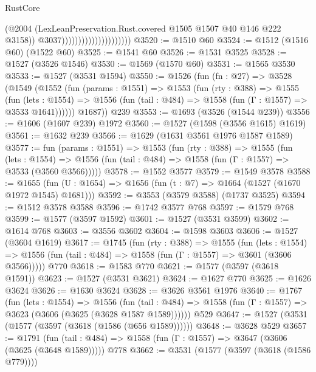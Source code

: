 \begin{lexlean}{RustCore}
\begin{coremodule}
                                              (@2004
                                                (LexLeanPreservation.Rust.covered
                                                  @1505
                                                  @1507
                                                  @40
                                                  @146
                                                  @222
                                                  @3158))
                                              @3037)))))))))))))))))))))
@3520 := @1510 @60
@3524 := @1512 (@1516 @60) (@1522 @60)
@3525 := @1541 @60
@3526 := @1531 @3525
@3528 := @1527 (@3526 @1546)
@3530 := @1569 (@1570 @60)
@3531 := @1565 @3530
@3533 := @1527 (@3531 @1594)
@3550 := @1526
    (fun (fn : @27) =>
    @3528
      (@1549
        (@1552
          (fun (params : @1551) =>
          @1553
            (fun (rty : @388) =>
            @1555
              (fun (lets : @1554) =>
              @1556 (fun (tail : @484) => @1558 (fun (Γ : @1557) => @3533 @1641))))))
        @1687))
    @239
@3553 := @1693 (@3526 (@1544 @239))
@3556 := @1606 (@1607 @239) @1972
@3560 := @1527 (@1598 (@3556 @1615) @1619)
@3561 := @1632 @239
@3566 := @1629 (@1631 @3561 @1976 @1587 @1589)
@3577 := fun (params : @1551) =>
  @1553
    (fun (rty : @388) =>
    @1555
      (fun (lets : @1554) =>
      @1556 (fun (tail : @484) => @1558 (fun (Γ : @1557) => @3533 (@3560 @3566)))))
@3578 := @1552 @3577
@3579 := @1549 @3578
@3588 := @1655 (fun (U : @1654) => @1656 (fun (t : @7) => @1664 (@1527 (@1670 @1972 @1545) @1681)))
@3592 := @3553 (@3579 @3588) (@1737 @3525)
@3594 := @1512 @3578 @3588
@3596 := @1742 @3577 @768
@3597 := @1579 @768
@3599 := @1577 (@3597 @1592)
@3601 := @1527 (@3531 @3599)
@3602 := @1614 @768
@3603 := @3556 @3602
@3604 := @1598 @3603
@3606 := @1527 (@3604 @1619)
@3617 := @1745
    (fun (rty : @388) =>
    @1555
      (fun (lets : @1554) =>
      @1556 (fun (tail : @484) => @1558 (fun (Γ : @1557) => @3601 (@3606 @3566)))))
    @770
@3618 := @1583 @770
@3621 := @1577 (@3597 (@3618 @1591))
@3623 := @1527 (@3531 @3621)
@3624 := @1627 @770
@3625 := @1626 @3624
@3626 := @1630 @3624
@3628 := @3626 @3561 @1976
@3640 := @1767
    (fun (lets : @1554) =>
    @1556
      (fun (tail : @484) => @1558 (fun (Γ : @1557) => @3623 (@3606 (@3625 (@3628 @1587 @1589))))))
    @529
@3647 := @1527 (@3531 (@1577 (@3597 (@3618 (@1586 (@656 @1589))))))
@3648 := @3628 @529
@3657 := @1791
    (fun (tail : @484) => @1558 (fun (Γ : @1557) => @3647 (@3606 (@3625 (@3648 @1589)))))
    @778
@3662 := @3531 (@1577 (@3597 (@3618 (@1586 @779))))

\end{coremodule}
\end{lexlean}
